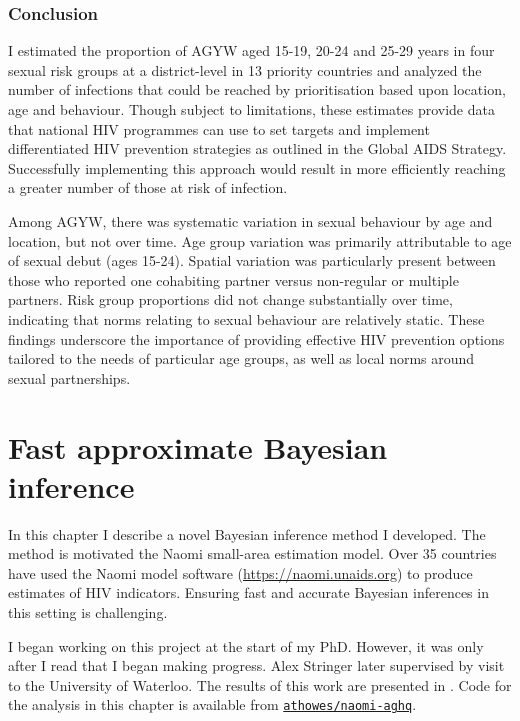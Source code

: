 \documentclass[a4paper, nobind]{templates/ociamthesis}
\begin{document}
\hypertarget{conclusion}{%
\subsection{Conclusion}\label{conclusion}}

I estimated the proportion of AGYW aged 15-19, 20-24 and 25-29 years in four sexual risk groups at a district-level in 13 priority countries and analyzed the number of infections that could be reached by prioritisation based upon location, age and behaviour.
Though subject to limitations, these estimates provide data that national HIV programmes can use to set targets and implement differentiated HIV prevention strategies as outlined in the Global AIDS Strategy.
Successfully implementing this approach would result in more efficiently reaching a greater number of those at risk of infection.

Among AGYW, there was systematic variation in sexual behaviour by age and location, but not over time.
Age group variation was primarily attributable to age of sexual debut (ages 15-24).
Spatial variation was particularly present between those who reported one cohabiting partner versus non-regular or multiple partners.
Risk group proportions did not change substantially over time, indicating that norms relating to sexual behaviour are relatively static.
These findings underscore the importance of providing effective HIV prevention options tailored to the needs of particular age groups, as well as local norms around sexual partnerships.

\hypertarget{naomi-aghq}{%
\chapter{Fast approximate Bayesian inference}\label{naomi-aghq}}

\adjustmtc
{}

In this chapter I describe a novel Bayesian inference method I developed.
The method is motivated the Naomi small-area estimation model.
Over 35 countries have used the Naomi model software (\url{https://naomi.unaids.org}) to produce estimates of HIV indicators.
Ensuring fast and accurate Bayesian inferences in this setting is challenging.

I began working on this project at the start of my PhD.
However, it was only after I read \textcite{stringer2021fast} that I began making progress.
Alex Stringer later supervised by visit to the University of Waterloo.
The results of this work are presented in \textcite{howes2023fast}.
Code for the analysis in this chapter is available from \href{https://github.com/athowes/elgm-inf}{\texttt{athowes/naomi-aghq}}.
\end{document}
